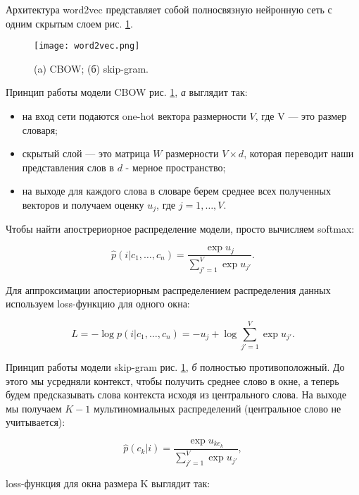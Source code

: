 \bigskip
Архитектура word2vec представляет собой полносвязную нейронную сеть с одним скрытым слоем рис.
\ref{fig:word2vec}.

\begin{figure}[ht]
    \centering
    \texttt{[image: word2vec.png]}
    \caption{(a) CBOW; (б) skip-gram.}
    \label{fig:word2vec}
\end{figure}

Принцип работы модели CBOW \cite{Nikolenko} рис. \ref{fig:word2vec}, \textit{а}  выглядит так:

\bigskip
\begin{itemize}
 \item на вход сети подаются one-hot вектора размерности $V$, где V --- это размер словаря;
 \item скрытый слой --- это матрица $W$ размерности $V\times d$, которая переводит наши представления слов в
$d$ - мерное пространство;
 \item на выходе для каждого слова в словаре берем среднее всех полученных векторов и получаем оценку $u_j$,
где $j = 1, \ldots, V$.
\end{itemize}

\bigskip
Чтобы найти апострериорное распределение модели, просто вычисляем softmax:

\begin{equation}
 \hat{p}(i|c_1, \ldots, c_n) = \frac{\exp{u_j}}{\sum_{j'=1}^V \exp{u_{j'}}}.
\end{equation}

Для аппроксимации апостериорным распределением распределения данных используем loss-функцию для одного окна:

\begin{equation}
 L = -\log{p(i|c_1, \ldots, c_n)} = - u_j + \log{\sum_{j'=1}^{V} \exp{u_{j'}}}.
\end{equation}

Принцип работы модели skip-gram рис. \ref{fig:word2vec}, \textit{б} полностью противоположный. До этого мы
усредняли контекст, чтобы получить среднее слово в окне, а теперь будем предсказывать слова контекста исходя
из центрального слова. На выходе мы получаем $K-1$ мультиномиальных распределений (центральное слово не
учитывается):

\begin{equation}
 \hat{p}(c_k|i) = \frac{\exp{u_{kc_k}}}{\sum_{j'=1}^V \exp{u_{j'}}},
\end{equation}

loss-функция для окна размера K выглядит так:

